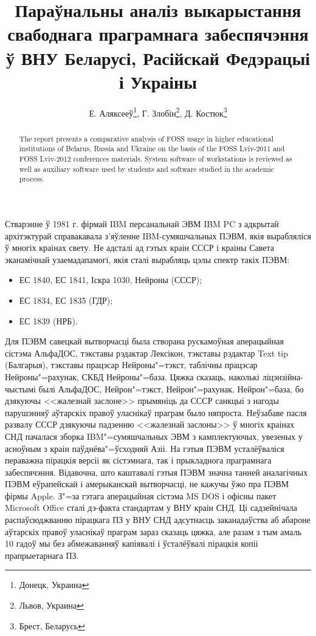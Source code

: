 \documentclass[10pt, a5paper]{article}
\begin{document}
\title{Параўнальны аналіз выкарыстання свабоднага праграмнага забеспячэння ў ВНУ Беларусі, Расійскай Федэрацыі і Украіны}%

\author{Е. Аляксееў\footnote{Донецк, Украина}, Г. Злобін\footnote{Львов, Украина}, Д. Костюк\footnote{Брест, Беларусь}}
\maketitle

\begin{abstract}
The report presents a comparative analysis of FOSS usage in higher educational institutions of Belarus, Russia and Ukraine on the basis of the FOSS Lviv-2011 and FOSS Lviv-2012 conferences materials. System software of workstations is reviewed as well as auxiliary software used by students and software studied in the academic process.
\end{abstract}

Стварэнне ў 1981 г. фірмай IBM персанальнай ЭВМ IBM PC з адкрытай архітэктурай справакавала з'яўленне IBM-сумяшчальных ПЭВМ, якія вырабляліся ў многіх краінах свету. Не адсталі ад гэтых краін СССР і краіны Савета эканамічнай узаемадапамогі, якія сталі вырабляць цэлы спектр такіх ПЭВМ:

\begin{itemize}
  \item ЕС 1840, ЕС 1841, Іскра 1030, Нейроны (СССР);
  \item ЕС 1834, ЕС 1835 (ГДР);
  \item ЕС 1839 (НРБ).
\end{itemize}

Для ПЭВМ савецкай вытворчасці была створана рускамоўная аперацыйная сістэма
АльфаДОС, тэкставы рэдактар Лексікон, тэкставы рэдактар Text tip (Балгарыя),
тэкставы працэсар Нейроны"=тэкст, таблічны працэсар Нейроны"=рахунак, СКБД
Нейроны"=база. Цяжка сказаць, наколькі ліцэнзійна-чыстымі былі АльфаДОС,
Нейрон"=тэкст, Нейрон"=рахунак, Нейрон"=база, бо дзякуючы <<жа\-лез\-най заслоне>>
прымяніць да СССР санкцыі з нагоды парушэнняў аўтарскіх правоў уласнікаў
праграм было няпроста. Неўзабаве пасля развалу СССР дзякуючы падзенню
<<жалезнай заслоны>> ў многіх краінах СНД пачалася зборка IBM"=сумяшчальных ЭВМ
з камплектуючых, увезеных у асноўным з краін паўднёва"=ўсходняй Азіі. На гэтыя
ПЭВМ усталёўваліся пераважна пірацкія версіі як сістэмнага, так і прыкладнога
праграмнага забеспячэння. Відавочна, што каштавалі гэтыя ПЭВМ значна танней
аналагічных ПЭВМ еўрапейскай і амерыканскай вытворчасці, не кажучы ўжо пра
ПЭВМ фірмы Apple. З"=за гэтага аперацыйная сістэма MS DOS і офісны пакет Microsoft Office
сталі дэ-факта стандартам у ВНУ краін СНД. Ці садзейнічала распаўсюджванню
пірацкага ПЗ у ВНУ СНД адсутнасць заканадаўства аб абароне аўтарскіх правоў
уласнікаў праграм зараз сказаць цяжка, але разам з тым амаль 10 гадоў мы без
абмежаванняў капіявалі і ўсталёўвалі пірацкія копіі прапрыетарнага ПЗ.
\end{document}
